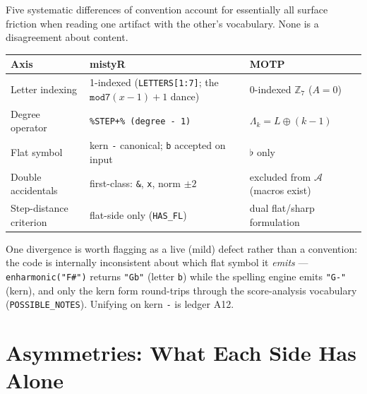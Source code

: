 \documentclass[11pt]{article}
\newcommand{\Lam}{\Lambda}                      %
\newcommand{\Accset}{\mathcal{A}}               %
\newcommand{\Zseven}{\mathbb{Z}_7}
\newcommand{\kernflat}{\texttt{-}}              %
\theoremstyle{definition}
\theoremstyle{remark}
\newcommand{\code}[1]{\texttt{#1}}
\begin{document}
Five systematic differences of convention account for essentially all surface
friction when reading one artifact with the other's vocabulary. None is a
disagreement about content.

\begin{center}
\renewcommand{\arraystretch}{1.35}
\begin{tabular}{@{}p{3.4cm}p{4.6cm}p{4.6cm}@{}}
\toprule
\textbf{Axis} & \textbf{mistyR} & \textbf{MOTP} \\
\midrule
Letter indexing & 1-indexed (\code{LETTERS[1:7]}; the $\code{mod7}(x-1)+1$ dance) & 0-indexed $\Zseven$ ($A = 0$) \\
Degree operator & \code{\%STEP+\% (degree - 1)} & $\Lam_k = L \oplus (k - 1)$ \\
Flat symbol & kern \kernflat{} canonical; \code{b} accepted on input & $\flat$ only \\
Double accidentals & first-class: \code{\&}, \code{x}, norm $\pm 2$ & excluded from $\Accset$ (macros exist) \\
Step-distance criterion & flat-side only (\code{HAS\_FL}) & dual flat/sharp formulation \\
\bottomrule
\end{tabular}
\end{center}

One divergence is worth flagging as a live (mild) defect rather than a
convention: the code is internally inconsistent about which flat symbol it
\emph{emits} --- \code{enharmonic("F\#")} returns \code{"Gb"} (letter
\code{b}) while the spelling engine emits \code{"G-"} (kern), and only the
kern form round-trips through the score-analysis vocabulary
(\code{POSSIBLE\_NOTES}). Unifying on kern \kernflat{} is ledger A12.

\section{Asymmetries: What Each Side Has Alone}\label{sec:asymmetries}
\end{document}
